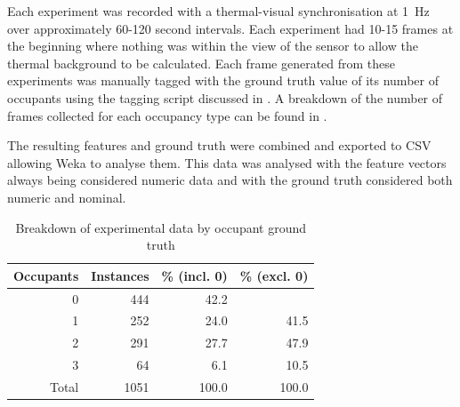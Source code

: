 \documentclass[../thesis/thesis.tex]{subfiles}
\begin{document}
Each experiment was recorded with a thermal-visual synchronisation at 1~Hz over approximately 60-120 second intervals. Each experiment had 10-15 frames at the beginning where nothing was within the view of the sensor to allow the thermal background to be calculated. Each frame generated from these experiments was manually tagged with the ground truth value of its number of occupants using the tagging script discussed in . A breakdown of the number of frames collected for each occupancy type can be found in .

The resulting features and ground truth were combined and exported to CSV allowing Weka to analyse them. This data was analysed with the feature vectors always being considered numeric data and with the ground truth considered both numeric and nominal.

\begin{table}
\centering
\begin{tabular}{|r|r|r|r|}
\hline
\textbf{Occupants} & \textbf{Instances} & \textbf{\% (incl. 0)} & \textbf{\% (excl. 0)} \\ \hline
0                  & 444                & 42.2                  &                       \\ \hline
1                  & 252                & 24.0                  & 41.5                  \\ \hline
2                  & 291                & 27.7                  & 47.9                  \\ \hline
3                  & 64                 & 6.1                   & 10.5                  \\ \hline
Total              & 1051               & 100.0                 & 100.0                 \\ \hline
\end{tabular}
\caption{Breakdown of experimental data by occupant ground truth}
\label{tab:expbreak}
\end{table}
\end{document}
